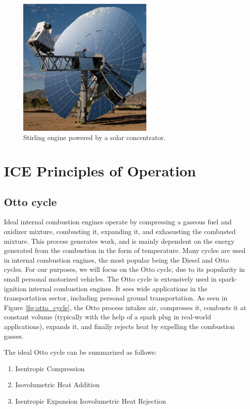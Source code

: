 \documentclass[conf]{new-aiaa}
\begin{document}
\begin{figure}[H]
    \centering
    \includegraphics[width=0.6\textwidth]{Figures/stirling.jpg}
    \caption{Stirling engine powered by a solar concentrator.}
    \label{fig:stirling}
\end{figure}


\pagebreak

\section{ICE Principles of Operation}
\subsection{Otto cycle}
Ideal internal combustion engines operate by compressing a gaseous fuel and oxidizer mixture, combusting it, expanding it, and exhasusting the combusted mixture. This process generates work, and is mainly dependent on the energy generated from the combustion in the form of temperature. Many cycles are used in internal combustion engines, the most popular being the Diesel and Otto cycles. For our purposes, we will focus on the Otto cycle, due to its popularity in small personal motorized vehicles.
The Otto cycle is extensively used in spark-ignition internal combustion engines. It sees wide applications in the transportation sector, including personal ground transportation. As seen in Figure \ref{fig:otto_cycle}, the Otto process intakes air, compresses it, combusts it at constant volume (typically with the help of a spark plug in real-world applications), expands it, and finally rejects heat by expelling the combustion gasses.

The ideal Otto cycle can be summarized as follows:
\begin{enumerate}
  \item Isentropic Compression
  \item Isovolumetric Heat Addition
  \item Isentropic Expansion
  \time Isovolumetric Heat Rejection
\end{enumerate}
\end{document}
